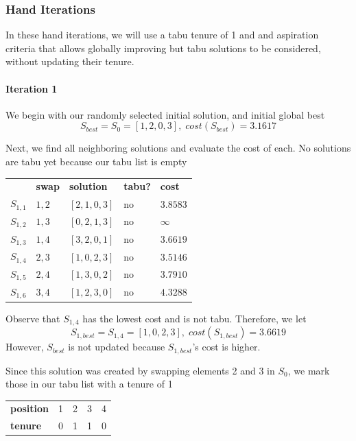 \documentclass[a4paper]{article}
\newcommand{\subsubsubsection}[1]{\paragraph{#1} \mbox{}}
\begin{document}
\subsubsection{Hand Iterations}

In these hand iterations, we will use a tabu tenure of 1 and and aspiration criteria that allows globally improving but tabu solutions to be considered, without updating their tenure.

\subsubsubsection{Iteration 1}

We begin with our randomly selected initial solution, and initial global best
$$S_\textit{best} = S_0 = [ 1, 2, 0, 3 ], \; \textit{cost}(S_\textit{best}) = 3.1617$$

Next, we find all neighboring solutions and evaluate the cost of each. No solutions are tabu yet because our tabu list is empty
\begin{center}
\begin{tabular}{lllll}
& \textbf{swap}   & \textbf{solution}    & \textbf{tabu?} & \textbf{cost}  \\
$S_{1,1}$ & $1,2$ & $[2, 1, 0, 3]$ & no & $3.8583$ \\
$S_{1,2}$ & $1,3$ & $[0, 2, 1, 3]$ & no & $\infty$ \\
$S_{1,3}$ & $1,4$ & $[3, 2, 0, 1]$ & no & $3.6619$ \\
$S_{1,4}$ & $2,3$ & $[1, 0, 2, 3]$ & no & $3.5146$ \\
$S_{1,5}$ & $2,4$ & $[1, 3, 0, 2]$ & no & $3.7910$ \\
$S_{1,6}$ & $3,4$ & $[1, 2, 3, 0]$ & no & $4.3288$ \\
\end{tabular}
\end{center}
\vspace{1.5em}

Observe that $S_{1,4}$ has the lowest cost and is not tabu. Therefore, we let
$$S_{1, \textit{best}} = S_{1,4} = [1, 0, 2, 3], \; \textit{cost}(S_{1, \textit{best}}) = 3.6619$$
However, $S_\textit{best}$ is not updated because $S_{1, \textit{best}}$'s cost is higher.

Since this solution was created by swapping elements 2 and 3 in $S_0$, we mark those in our tabu list with a tenure of 1
\begin{center}
\begin{tabular}{lllll}
\textbf{position} & 1 & 2 & 3 & 4 \\
\textbf{tenure}   & 0 & 1 & 1 & 0
\end{tabular}
\end{center}
\vspace{1.5em}
\end{document}
